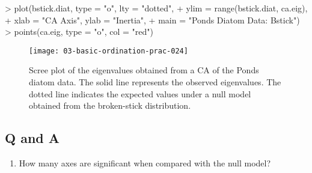 \documentclass[a4paper,10pt]{article}
\begin{document}
\begin{Schunk}
\begin{Sinput}
> plot(bstick.diat, type = "o", lty = "dotted",
+      ylim = range(bstick.diat, ca.eig),
+      xlab = "CA Axis", ylab = "Inertia",
+      main = "Ponds Diatom Data: Bstick")
> points(ca.eig, type = "o", col = "red")
\end{Sinput}
\end{Schunk}
\begin{figure}[t]
\begin{center}
\texttt{[image: 03-basic-ordination-prac-024]}
\caption{\label{ca_bstick}Scree plot of the eigenvalues obtained from a CA of the Ponds diatom data. The solid line represents the observed eigenvalues. The dotted line indicates the expected values under a null model obtained from the broken-stick distribution.}
\end{center}
\end{figure}
\subsection*{Q and A}
\begin{enumerate}
\item How many axes are significant when compared with the null model?
\end{enumerate}
\end{document}
